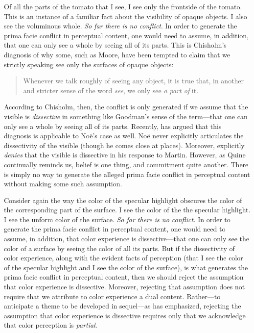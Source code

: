 \documentclass[12pt]{article}
\begin{document}
Of all the parts of the tomato that I see, I see only the frontside of the tomato. This is an instance of a familiar fact about the visibility of opaque objects. I also see the voluminous whole. \emph{So far there is no conflict}. In order to generate the prima facie conflict in perceptual content, one would need to assume, in addition, that one can only see a whole by seeing all of its parts. This is Chisholm's \citeyearpar[154--156]{Chisholm:1957dq} diagnosis of why some, such as Moore, have been tempted to claim that we strictly speaking see only the surfaces of opaque objects:
\begin{quote}
	Whenever we talk roughly of seeing any object, it is true that, in another and stricter sense of the word \emph{see}, we only see \emph{a part of} it. \citep[34]{Moore:1953nx}
\end{quote}
According to Chisholm, then, the conflict is only generated if we assume that the visible is \emph{dissective} in something like Goodman's \citeyearpar[48-49]{Goodman:1951ww} sense of the term---that one can only see a whole by seeing all of its parts. Recently, \citet{Martin:2008kl} has argued that this diagnosis is applicable to Noë's case as well. Noë never explicitly articulates the dissectivity of the visible (though he comes close at places). Moreover, \citet[698-699]{Noe:2008oq} explicitly \emph{denies} that the visible is dissective in his response to Martin. However, as Quine continually reminds us, belief is one thing, and commitment quite another. There is simply no way to generate the alleged prima facie conflict in perceptual content without making some such assumption.


Consider again the way the color of the specular highlight obscures the color of the corresponding part of the surface. I see the color of the the specular highlight. I see the unform color of the surface. \emph{So far there is no conflict.} In order to generate the prima facie conflict in perceptual content, one would need to assume, in addition, that color experience is dissective---that one can only see the color of a surface by seeing the color of all its parts. But if the dissectivity of color experience, along with the evident facts of perception (that I see the color of the specular highlight and I see the color of the surface), is what generates the prima facie conflict in perceptual content, then we should reject the assumption that color experience is dissective. Moreover, rejecting that assumption does not require that we attribute to color experience a dual content. Rather---to anticipate a theme to be developed in sequel---as \citet{Hilbert:1987jq} has emphasized, rejecting the assumption that color experience is dissective requires only that we acknowledge that color perception is \emph{partial}.\\
\end{document}
